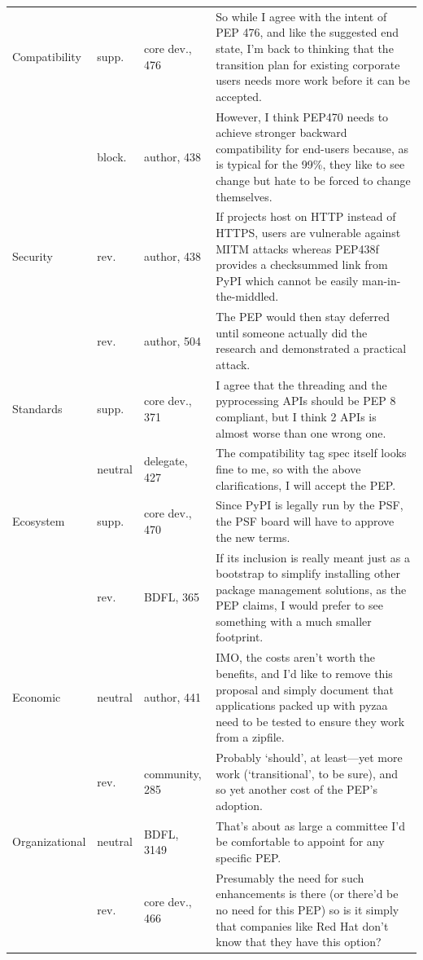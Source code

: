 \documentclass[sigconf,screen]{acmart}
\begin{document}
\begin{table}
\begin{tabular}{p{}p{}p{}p{}}
\midrule
Compatibility & supp. & core dev., 476 & So while I agree with the intent of PEP 476, and like the suggested end state, I'm back to thinking that the transition plan for existing corporate users needs more work before it can be accepted. \\
 & block. & author, 438 & However, I think PEP470 needs to achieve stronger backward compatibility for end-users because, as is typical for the 99\%, they like to see change but hate to be forced to change themselves. \\
\midrule
Security & rev. & author, 438 & If projects host on HTTP instead of HTTPS, users are vulnerable against MITM attacks whereas PEP438f provides a checksummed link from PyPI which cannot be easily man-in-the-middled. \\
 & rev. & author, 504 & The PEP would then stay deferred until someone actually did the research and demonstrated a practical attack. \\
\midrule
Standards & supp. & core dev., 371 & I agree that the threading and the pyprocessing APIs should be PEP 8 compliant, but I think 2 APIs is almost worse than one wrong one. \\
 & neutral & delegate, 427 & The compatibility tag spec itself looks fine to me, so with the above clarifications, I will accept the PEP. \\
\midrule
Ecosystem & supp. & core dev., 470 & Since PyPI is legally run by the PSF, the PSF board will have to approve the new terms. \\
 & rev. & BDFL, 365 & If its inclusion is really meant just as a bootstrap to simplify installing other package management solutions, as the PEP claims, I would prefer to see something with a much smaller footprint. \\
\midrule
Economic & neutral & author, 441 & IMO, the costs aren't worth the benefits, and I'd like to remove this proposal and simply document that applications packed up with pyzaa need to be tested to ensure they work from a zipfile. \\
 & rev. & community, 285 & Probably `should', at least---yet more work (`transitional', to be sure), and so yet another cost of the PEP's adoption. \\
\midrule
Organizational & neutral & BDFL, 3149 & That's about as large a committee I'd be comfortable to appoint for any specific PEP. \\
 & rev. & core dev., 466 & Presumably the need for such enhancements is there (or there'd be no need for this PEP) so is it simply that companies like Red Hat don't know that they have this option? \\

\end{tabular}
\end{table}
\end{document}
